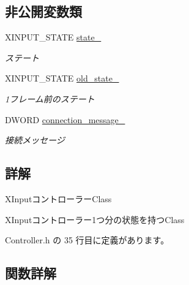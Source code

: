\subsection*{非公開変数類}
\begin{DoxyCompactItemize}
\item 
X\+I\+N\+P\+U\+T\+\_\+\+S\+T\+A\+TE \mbox{\hyperlink{class_controller_1_1_x_input_controller_a3ab82fee9794108189ed9851eca78cd9}{state\+\_\+}}
\begin{DoxyCompactList}\small\item\em ステート \end{DoxyCompactList}\item 
X\+I\+N\+P\+U\+T\+\_\+\+S\+T\+A\+TE \mbox{\hyperlink{class_controller_1_1_x_input_controller_a8b9cc519f51442d11b0eecf06afaf702}{old\+\_\+state\+\_\+}}
\begin{DoxyCompactList}\small\item\em 1フレーム前のステート \end{DoxyCompactList}\item 
D\+W\+O\+RD \mbox{\hyperlink{class_controller_1_1_x_input_controller_a9b2e2c583c4a0bc90ad3278860937e3f}{connection\+\_\+message\+\_\+}}
\begin{DoxyCompactList}\small\item\em 接続メッセージ \end{DoxyCompactList}\end{DoxyCompactItemize}


\subsection{詳解}
X\+Inputコントローラー\+Class 

X\+Inputコントローラー1つ分の状態を持つ\+Class 

 Controller.\+h の 35 行目に定義があります。



\subsection{関数詳解}
\mbox{\label{class_controller_1_1_x_input_controller_a5c87f062465413fbb4c9ebfeace86fed}} 
